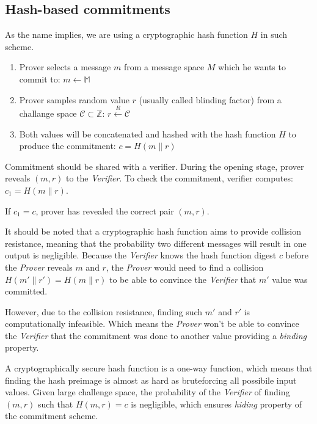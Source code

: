\documentclass[../lecture-notes.tex]{subfiles}
\begin{document}
\subsection{Hash-based commitments}

As the name implies, we are using a cryptographic hash function \(H\) in such scheme.

\begin{enumerate}
    \item Prover selects a message $m$ from a message space $M$ which he wants to commit to:
        $m \leftarrow \mathbb{M}$

    \item Prover samples random value $r$ (usually called blinding factor) from a challange space $\mathcal{C} \subset \mathbb{Z}$:
        $r \xleftarrow{R} \mathcal{C}$
    
    \item Both values will be concatenated and hashed with the hash function $H$ to produce the commitment:
        $c = H(m \parallel r)$

\end{enumerate}

Commitment should be shared with a verifier. During the opening stage, prover reveals $(m, r)$ to the \textit{Verifier}. 
To check the commitment, verifier computes: $c_1 = H(m \parallel r)$.

If $c_1 = c$, prover has revealed the correct pair $(m, r)$.

It should be noted that a cryptographic hash function aims to provide collision resistance, 
meaning that the probability two different messages will result in one output is negligible.
Because the \textit{Verifier} knows the hash function digest $c$ before the \textit{Prover} reveals $m$ and $r$, 
the \textit{Prover} would need to find a collision $H(m' \parallel r') = H(m \parallel r)$ to be able to convince the \textit{Verifier}
that $m'$ value was committed.

However, due to the collision resistance, finding such $m'$ and $r'$ is computationally infeasible. Which means the \textit{Prover}
won't be able to convince the \textit{Verifier} that the commitment was done to another value providing a \textit{binding} property.

A cryptographically secure hash function is a one-way function, which means that finding the hash preimage is almost as hard as bruteforcing
all possibile input values. Given large challenge space, the probability of the \textit{Verifier} of finding $(m, r)$ such that
$H(m, r) = c$ is negligible, which ensures \textit{hiding} property of the commitment scheme. 
\end{document}
